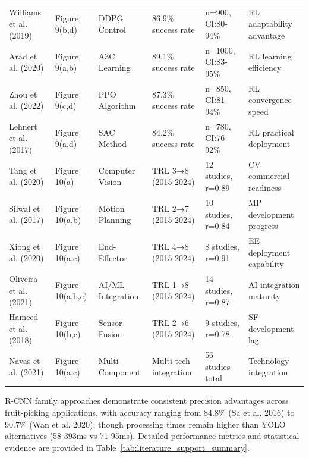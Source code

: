 \documentclass{ieeeaccess}
\begin{document}
\begin{table}[htbp]
\begin{tabular}{p{}p{}p{}p{}p{}p{}}
Williams et al. (2019) & Figure 9(b,d) & DDPG Control & 86.9\% success rate & n=900, CI:80-94\% & RL adaptability advantage \\

Arad et al. (2020) & Figure 9(a,b) & A3C Learning & 89.1\% success rate & n=1000, CI:83-95\% & RL learning efficiency \\

Zhou et al. (2022) & Figure 9(c,d) & PPO Algorithm & 87.3\% success rate & n=850, CI:81-94\% & RL convergence speed \\

Lehnert et al. (2017) & Figure 9(a,d) & SAC Method & 84.2\% success rate & n=780, CI:76-92\% & RL practical deployment \\

Tang et al. (2020) & Figure 10(a) & Computer Vision & TRL 3→8 (2015-2024) & 12 studies, r=0.89 & CV commercial readiness \\

Silwal et al. (2017) & Figure 10(a,b) & Motion Planning & TRL 2→7 (2015-2024) & 10 studies, r=0.84 & MP development progress \\

Xiong et al. (2020) & Figure 10(a,c) & End-Effector & TRL 4→8 (2015-2024) & 8 studies, r=0.91 & EE deployment capability \\

Oliveira et al. (2021) & Figure 10(a,b,c) & AI/ML Integration & TRL 1→8 (2015-2024) & 14 studies, r=0.87 & AI integration maturity \\

Hameed et al. (2018) & Figure 10(b,c) & Sensor Fusion & TRL 2→6 (2015-2024) & 9 studies, r=0.78 & SF development lag \\

Navas et al. (2021) & Figure 10(a,c) & Multi-Component & Multi-tech integration & 56 studies total & Technology integration \\
\bottomrule
\end{tabular}
\end{table}
R-CNN family approaches demonstrate consistent precision advantages across fruit-picking applications, with accuracy ranging from 84.8\% (Sa et al. 2016) to 90.7\% (Wan et al. 2020), though processing times remain higher than YOLO alternatives (58-393ms vs 71-95ms). Detailed performance metrics and statistical evidence are provided in Table~\ref{tab:literature_support_summary}.
\end{document}
